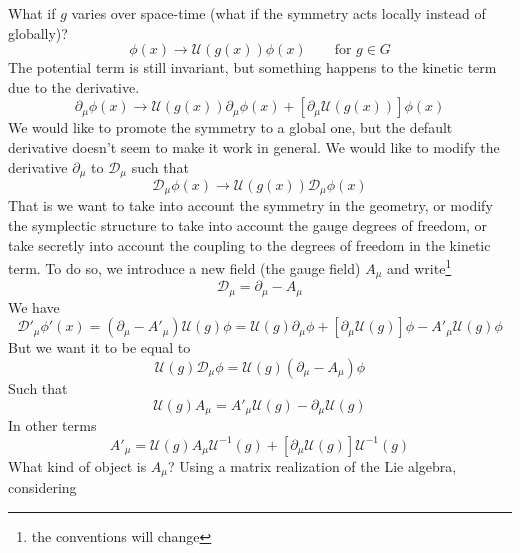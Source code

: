 \documentclass[a4paper]{book}
\theoremstyle{definition}
\theoremstyle{remark}
\begin{document}
What if $g$ varies over space-time (what if the symmetry acts locally instead of globally)?  
\begin{equation}
    \phi(x) \rightarrow \mathcal U (g(x))\phi(x) \qquad \text{for } g\in G
\end{equation}
The potential term is still invariant, but something happens to the kinetic term due to the derivative. 
\begin{equation}
    \partial_\mu \phi(x) \rightarrow \mathcal{U}(g(x)) \partial_\mu \phi(x) + \left[\partial_\mu \mathcal{U}(g(x))\right] \phi(x)
\end{equation}
We would like to promote the symmetry to a global one, but the default derivative doesn't seem to make it work in general. We would like to modify the derivative $\partial_\mu$ to $\mathcal D_\mu$ such that 
\begin{equation}
    \mathcal D_\mu \phi (x) \rightarrow \mathcal{U}(g(x)) \mathcal D _\mu \phi(x)
\end{equation}
That is we want to take into account the symmetry in the geometry, or modify the symplectic structure to take into account the gauge degrees of freedom, or take secretly into account the coupling to the degrees of freedom in the kinetic term. To do so, we introduce a new field (the gauge field) $A_\mu$ and write\footnote{the conventions will change}
\begin{equation}
    \mathcal D _\mu = \partial_\mu - A_\mu
\end{equation}
We have 
\begin{equation}
    \mathcal D' _\mu \phi'(x) = (\partial_\mu - A'_\mu) \mathcal U (g)\phi = \mathcal U (g) \partial_\mu \phi + \left[\partial_\mu \mathcal{U}(g)\right] \phi - A'_\mu\mathcal U (g)\phi 
\end{equation}
But we want it to be equal to 
\begin{equation}
    \mathcal U(g) \mathcal D_\mu \phi = \mathcal U(g)(\partial_\mu - A_\mu )\phi
\end{equation}
Such that 
\begin{equation}
    \mathcal U (g)A_\mu = A'_\mu \mathcal U(g) - \partial_\mu \mathcal U (g)
\end{equation}
In other terms
\begin{equation}
    A'_\mu = \mathcal U (g)A_\mu\mathcal U ^{-1}(g) + \left[\partial_\mu \mathcal U (g)\right] \mathcal U ^{-1}(g)
\end{equation}
What kind of object is $A_\mu$? Using a matrix realization of the Lie algebra, considering 
\end{document}
